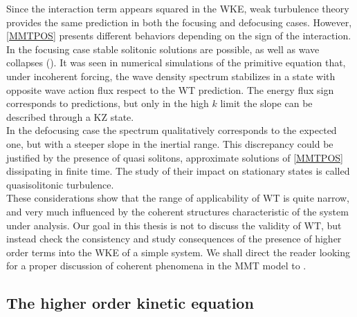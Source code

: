     Since the interaction term appears squared in the WKE, weak turbulence theory provides the same prediction in both the focusing and defocusing cases. 
    However, \eqref{MMTPOS} presents different behaviors depending on the sign of the interaction. 
    In the focusing case stable solitonic solutions are possible, as well as wave collapses
    (\cite{Zakharov2001}). It was seen in numerical simulations of the primitive equation that, under incoherent forcing, the wave density spectrum stabilizes in a state
    with opposite wave action flux respect to the WT prediction. The energy flux sign corresponds to predictions, but only in the high $k$ limit the slope can be 
    described through a KZ state.\\
    In the defocusing case the spectrum qualitatively corresponds to the expected one, but with a steeper slope in the inertial range. This discrepancy could be justified 
    by the presence of quasi solitons, approximate solutions of \eqref{MMTPOS} dissipating in finite time. The study of their impact on stationary states is called 
    quasisolitonic turbulence. \\
    These considerations show that the range of applicability of WT is quite narrow, and very much influenced by the coherent structures characteristic of the system under analysis. 
    Our goal in this thesis is not to discuss the validity of WT, but instead check the consistency and study consequences of the presence of higher order terms into the 
    WKE of a simple system. We shall direct the reader looking for a proper discussion of 
    coherent phenomena in the MMT model to \cite{ZAKHAROV2004}. \\
    \subsection{The higher order kinetic equation}

